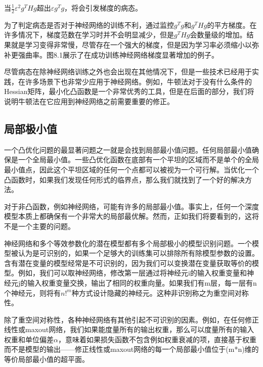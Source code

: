 当$\frac{1}{2} \varepsilon^2 g^THg$超出$\varepsilon g^Tg$，将会引发梯度的病态。


为了判定病态是否对于神经网络的训练不利，通过监控$g^Tg$和$g^THg$的平方梯度。在许多情况下，梯度范数在学习时并不会明显减少，但是$g^THg$会数量级的增加。结果就是学习变得非常慢，尽管存在一个强大的梯度，但是因为学习率必须缩小以弥补更强曲率。图8.1展示了在成功训练神经网络梯度显著增加的例子。

尽管病态在除神经网络训练之外也会出现在其他情况下，但是一些技术已经用于实践，在许多场景下也非常少应用于神经网络。例如，牛顿法对于没有什么条件的Hessian矩阵，最小化凸函数是一个非常优秀的工具，但是在后面的部分，我们将说明牛顿法在它应用到神经网络之前需要重要的修正。

\subsection{局部极小值}

一个凸优化问题的最显著问题之一就是会找到局部最小值问题。任何局部最小值确保是一个全局最小值。一些凸优化函数在底部有一个平坦的区域而不是单个的全局最小值点，因此这个平坦区域的任何一个点都可以被视为一个可行解。当优化一个凸函数时，如果我们发现任何形式的临界点，那么我们就找到了一个好的解决方法。

对于非凸函数，例如神经网络，可能有许多的局部最小值。事实上，任何一个深度模型本质上都确保有一个非常大的局部最优解。然而，正如我们将要看到的，这将不是一个主要的问题。

神经网络和多个等效参数化的潜在模型都有多个局部极小的模型识别问题。一个模型被认为是可识别的，如果一个足够大的训练集可以排除所有除模型参数的设置。含有潜在变量的模型经常是不可识别的，因为我们可以变换潜在变量获取等价的模型。例如，我们可以取神经网络，修改第一层通过将神经元i的输入权重变量和神经元j的输入权重变量交换，输出了相同的权重向量。如果我们有m层，每一层有n个神经元，则将有$n!^{m}$种方式设计隐藏的神经元。这种非识别称之为重空间对称性。

除了重空间对称性，各种神经网络有其他引起不可识别的因素。例如，在任何修正线性或maxout网络，我们如果能度量所有的输出权重，那么可以度量所有的输入权重和单位偏差$\alpha$，意味着如果损失函数不包含例如权重衰减的项，直接基于权重而不是模型的输出——修正线性或maxout网络的每一个局部最小值位于(m*n)维的等价局部最小值的超平面。

